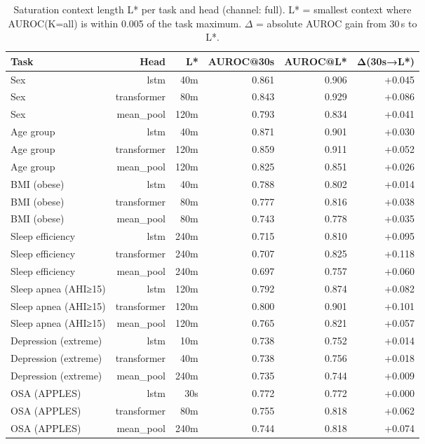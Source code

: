 \begin{table}[ht]
\centering
\caption{Saturation context length L* per task and head (channel: full). L* = smallest context where AUROC(K=all) is within 0.005 of the task maximum. $\Delta$ = absolute AUROC gain from 30\,s to L*.}
\label{tab:lstar_full}
\begin{tabular}{lrrrrr}
\toprule
Task & Head & L* & AUROC@30s & AUROC@L* & Δ(30s→L*) \\
\midrule
Sex & lstm & 40m & 0.861 & 0.906 & +0.045 \\
Sex & transformer & 80m & 0.843 & 0.929 & +0.086 \\
Sex & mean_pool & 120m & 0.793 & 0.834 & +0.041 \\
Age group & lstm & 40m & 0.871 & 0.901 & +0.030 \\
Age group & transformer & 120m & 0.859 & 0.911 & +0.052 \\
Age group & mean_pool & 120m & 0.825 & 0.851 & +0.026 \\
BMI (obese) & lstm & 40m & 0.788 & 0.802 & +0.014 \\
BMI (obese) & transformer & 80m & 0.777 & 0.816 & +0.038 \\
BMI (obese) & mean_pool & 80m & 0.743 & 0.778 & +0.035 \\
Sleep efficiency & lstm & 240m & 0.715 & 0.810 & +0.095 \\
Sleep efficiency & transformer & 240m & 0.707 & 0.825 & +0.118 \\
Sleep efficiency & mean_pool & 240m & 0.697 & 0.757 & +0.060 \\
Sleep apnea (AHI≥15) & lstm & 120m & 0.792 & 0.874 & +0.082 \\
Sleep apnea (AHI≥15) & transformer & 120m & 0.800 & 0.901 & +0.101 \\
Sleep apnea (AHI≥15) & mean_pool & 120m & 0.765 & 0.821 & +0.057 \\
Depression (extreme) & lstm & 10m & 0.738 & 0.752 & +0.014 \\
Depression (extreme) & transformer & 40m & 0.738 & 0.756 & +0.018 \\
Depression (extreme) & mean_pool & 240m & 0.735 & 0.744 & +0.009 \\
OSA (APPLES) & lstm & 30s & 0.772 & 0.772 & +0.000 \\
OSA (APPLES) & transformer & 80m & 0.755 & 0.818 & +0.062 \\
OSA (APPLES) & mean_pool & 240m & 0.744 & 0.818 & +0.074 \\
\bottomrule
\end{tabular}
\end{table}
